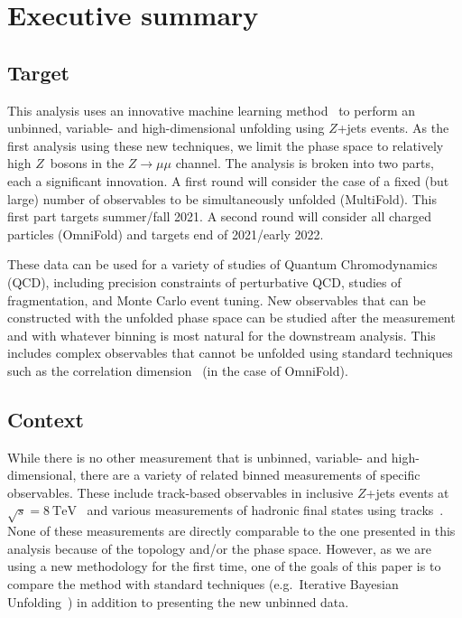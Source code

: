 \section{Executive summary}
\label{sec:exec}

\subsection{Target}

This analysis uses an innovative machine learning method~\cite{1911.09107} to perform an unbinned, variable- and high-dimensional unfolding using $Z$+jets events. As the first analysis using these new techniques, we limit the phase space to relatively high \pt{} $Z$~bosons in the $Z\to\mu\mu$ channel.   The analysis is broken into two parts, each a significant innovation.  A first round will consider the case of a fixed (but large) number of observables to be simultaneously unfolded (MultiFold).  This first part targets summer/fall 2021.  A second round will consider all charged particles (OmniFold) and targets end of 2021/early 2022.

These data can be used for a variety of studies of Quantum Chromodynamics (QCD), including precision constraints of perturbative QCD, studies of fragmentation, and Monte Carlo event tuning.  New observables that can be constructed with the unfolded phase space can be studied after the measurement and with whatever binning is most natural for the downstream analysis.  This includes complex observables that cannot be unfolded using standard techniques such as the correlation dimension~\cite{Komiske:2019fks} (in the case of OmniFold).

\subsection{Context}

While there is no other measurement that is unbinned, variable- and high-dimensional, there are a variety of related binned measurements of specific observables.   These include track-based observables in inclusive $Z$+jets events at $\sqrt{s}=\SI{8}{\TeV}$~\cite{STDM-2015-14} and various measurements of hadronic final states using tracks~\cite{STDM-2018-57,STDM-2017-33,STDM-2017-16}.  None of these measurements are directly comparable to the one presented in this analysis because of the topology and/or the phase space.  However, as we are using a new methodology for the first time, one of the goals of this paper is to compare the method with standard techniques (e.g.\ Iterative Bayesian Unfolding~\cite{DAGOSTINI1995487,1974AJ.....79..745L,Richardson:72}) in addition to presenting the new unbinned data.


